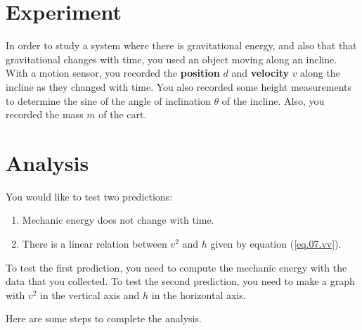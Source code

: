 \section{Experiment}
In order to study a system where there is gravitational energy, and also that that gravitational changes with time, you used an object moving along an incline. With a motion sensor, you recorded the \textbf{position} $d$ and \textbf{velocity} $v$ along the incline as they changed with time. You also recorded some height measurements to determine the sine of the angle of inclination $\theta$ of the incline. Also, you recorded the mass $m$ of the cart.
\section{Analysis}
You would like to test two predictions:
\begin{enumerate}
    \item Mechanic energy does not change with time.
    \item There is a linear relation between $v^{2}$ and $h$ given by equation (\ref{eq.07.vv}).
\end{enumerate}
To test the first prediction, you need to compute the mechanic energy with the data that you collected. To test the second prediction, you need to make a graph with $v^{2}$ in the vertical axis and $h$ in the horizontal axis.

Here are some steps to complete the analysis.
